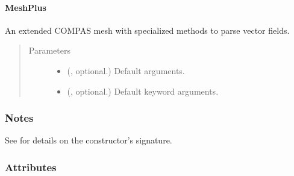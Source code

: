\documentclass[letterpaper,10pt,english]{sphinxmanual}
\begin{document}
\paragraph{MeshPlus}
\label{\detokenize{api/generated/directional_clustering.mesh.MeshPlus:meshplus}}\label{\detokenize{api/generated/directional_clustering.mesh.MeshPlus::doc}}

\begin{fulllineitems}
\label{\detokenize{api/generated/directional_clustering.mesh.MeshPlus:directional_clustering.mesh.MeshPlus}}
An extended COMPAS mesh with specialized methods to parse vector fields.
\begin{quote}\begin{description}
\item[{Parameters}] \leavevmode\begin{itemize}
\item {} 
 (, optional.) \textendash{} Default arguments.

\item {} 
 (, optional.) \textendash{} Default keyword arguments.

\end{itemize}

\end{description}\end{quote}
\subsubsection*{Notes}

See  for details on the constructor’s signature.
\subsubsection*{Attributes}


\begin{savenotes}\sphinxatlongtablestart\begin{longtable}[c]{}
\hline

\endfirsthead

%
{}\\
\hline


\end{longtable}
\end{savenotes}
\end{fulllineitems}
\end{document}
